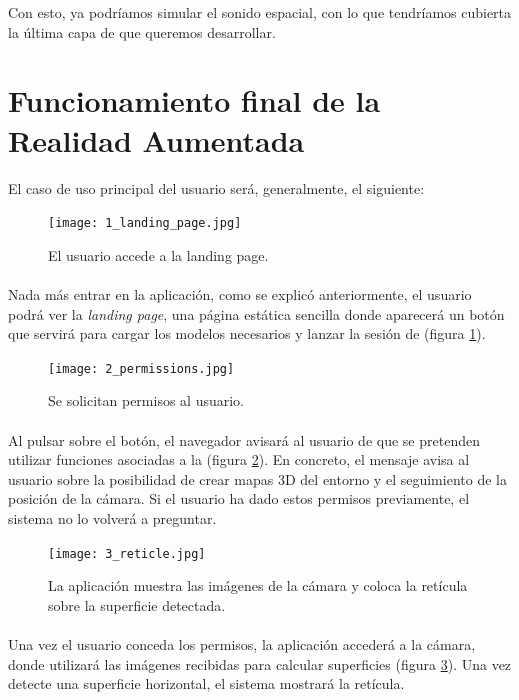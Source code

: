 \documentclass{subfiles}
\begin{document}
        Con esto, ya podríamos simular el sonido espacial, con lo que tendríamos cubierta la última capa de \ra que queremos desarrollar.

        \section{Funcionamiento final de la Realidad Aumentada}
        \label{sec:funcionamiento_final_de_la_realidad_aumentada}
        El caso de uso principal del usuario será, generalmente, el siguiente:

\begin{figure}[H]
\centering
\texttt{[image: 1\_landing\_page.jpg]}
\caption{El usuario accede a la landing page.}
\label{fig:1_landing_page}
\end{figure}

        \paragraph{}
        Nada más entrar en la aplicación, como se explicó anteriormente, el usuario podrá ver la \textit{landing page}, una página estática sencilla donde aparecerá un botón que servirá para cargar los modelos necesarios y lanzar la sesión de \ra (figura \ref{fig:1_landing_page}). 

\begin{figure}[H]
\centering
\texttt{[image: 2\_permissions.jpg]}
\caption{Se solicitan permisos al usuario.}
\label{fig:2_permissions}
\end{figure}

        \paragraph{}
        Al pulsar sobre el botón, el navegador avisará al usuario de que se pretenden utilizar funciones asociadas a la \ra (figura \ref{fig:2_permissions}). En concreto, el mensaje avisa al usuario sobre la posibilidad de crear mapas 3D del entorno y el seguimiento de la posición de la cámara. Si el usuario ha dado estos permisos previamente, el sistema no lo volverá a preguntar.

\begin{figure}[H]
\centering
\texttt{[image: 3\_reticle.jpg]}
\caption{La aplicación muestra las imágenes de la cámara y coloca la retícula sobre la superficie detectada.}
\label{fig:3_reticle}
\end{figure}

        \paragraph{}
        Una vez el usuario conceda los permisos, la aplicación accederá a la cámara, donde utilizará las imágenes recibidas para calcular superficies (figura \ref{fig:3_reticle}). Una vez detecte una superficie horizontal, el sistema mostrará la retícula.
\end{document}
